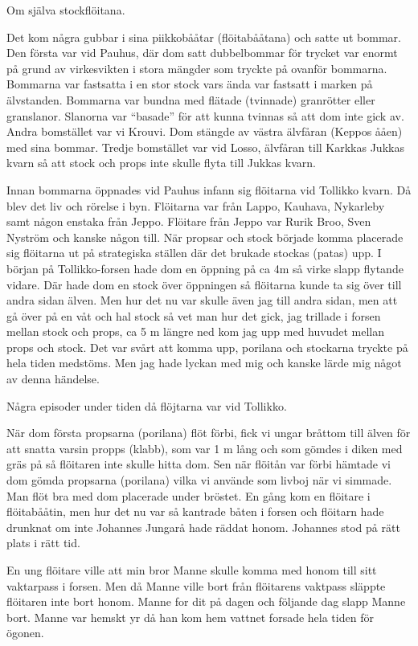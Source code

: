 Om själva stockflöitana.

Det kom några gubbar i sina piikkobååtar (flöitabååtana) och satte ut bommar. Den första var vid Pauhus, där dom satt dubbelbommar för trycket var enormt på grund av virkesvikten i stora mängder som tryckte på ovanför bommarna. Bommarna var fastsatta i en stor stock vars ända var fastsatt i marken på älvstanden. Bommarna var bundna med flätade (tvinnade) granrötter eller granslanor. Slanorna var ``basade'' för att kunna tvinnas så att dom inte gick av. Andra bomstället var vi Krouvi. Dom stängde av västra älvfåran (Keppos ååen) med sina bommar. Tredje bomstället var vid Losso, älvfåran till Karkkas Jukkas kvarn så att stock och props inte skulle flyta till Jukkas kvarn.

Innan bommarna öppnades vid Pauhus infann sig flöitarna vid Tollikko kvarn. Då blev det liv och rörelse i byn. Flöitarna var från Lappo, Kauhava, Nykarleby samt någon enstaka från Jeppo. Flöitare från Jeppo var Rurik Broo, Sven Nyström och kanske någon till. När propsar och stock började komma placerade sig flöitarna ut på strategiska ställen där det brukade stockas (patas) upp. I början på Tollikko-forsen hade dom en öppning på ca 4m så virke slapp flytande vidare. Där hade dom en stock över öppningen så flöitarna kunde ta sig över till andra sidan älven. Men hur det nu var skulle även jag till andra sidan, men att gå över på en våt och hal stock så vet man hur det gick, jag trillade i forsen mellan stock och props, ca 5 m längre ned kom jag upp med huvudet mellan props och stock. Det var svårt att komma upp, porilana och stockarna tryckte på hela tiden medstöms. Men jag hade lyckan med mig och kanske lärde mig något av denna händelse.


Några episoder under tiden då flöjtarna var vid Tollikko.

När dom första propsarna (porilana) flöt förbi, fick vi ungar bråttom till älven för att snatta varsin propps (klabb), som var 1 m lång och som gömdes i diken med gräs på så flöitaren inte skulle hitta dom. Sen när flöitån var förbi hämtade vi dom gömda propsarna (porilana) vilka vi använde som livboj när vi simmade. Man flöt bra med dom placerade under bröstet. En gång kom en flöitare i flöitabååtin, men hur det nu var så kantrade båten i forsen och flöitarn hade drunknat om inte Johannes Jungarå hade räddat honom. Johannes stod på rätt plats i rätt tid.

En ung flöitare ville att min bror Manne skulle komma med honom till sitt vaktarpass i forsen. Men då Manne ville bort från flöitarens vaktpass släppte flöitaren inte bort honom. Manne for dit på dagen och följande dag slapp Manne bort. Manne var hemskt yr då han kom hem vattnet forsade hela tiden för ögonen.

